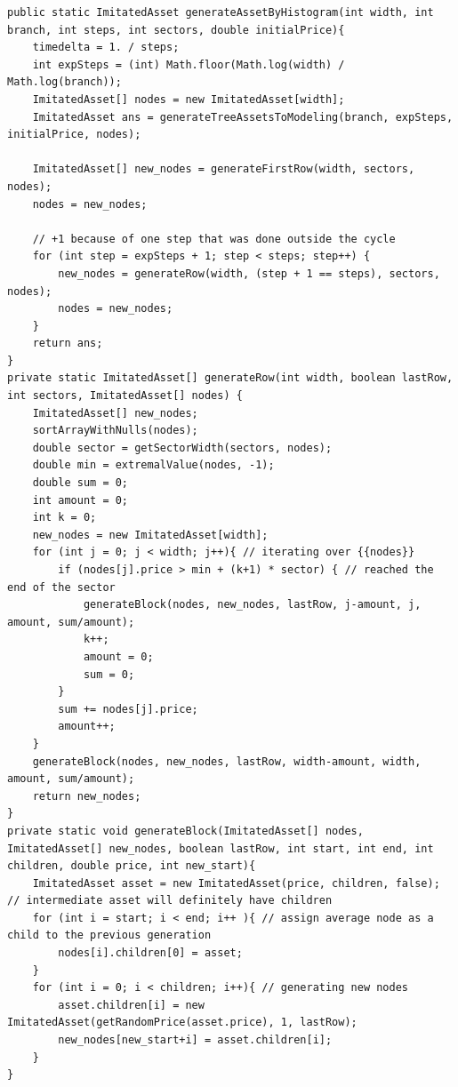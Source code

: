 \documentclass[12pt,twoside,titlepage,сa4paper]{article}
\begin{document}
	\begin{lstlisting}
public static ImitatedAsset generateAssetByHistogram(int width, int branch, int steps, int sectors, double initialPrice){
    timedelta = 1. / steps;
    int expSteps = (int) Math.floor(Math.log(width) / Math.log(branch));
    ImitatedAsset[] nodes = new ImitatedAsset[width];
    ImitatedAsset ans = generateTreeAssetsToModeling(branch, expSteps, initialPrice, nodes);

    ImitatedAsset[] new_nodes = generateFirstRow(width, sectors, nodes);
    nodes = new_nodes;

    // +1 because of one step that was done outside the cycle
    for (int step = expSteps + 1; step < steps; step++) {
        new_nodes = generateRow(width, (step + 1 == steps), sectors, nodes);
        nodes = new_nodes;
    }
    return ans;
}
private static ImitatedAsset[] generateRow(int width, boolean lastRow, int sectors, ImitatedAsset[] nodes) {
    ImitatedAsset[] new_nodes;
    sortArrayWithNulls(nodes);
    double sector = getSectorWidth(sectors, nodes);
    double min = extremalValue(nodes, -1);
    double sum = 0;
    int amount = 0;
    int k = 0;
    new_nodes = new ImitatedAsset[width];
    for (int j = 0; j < width; j++){ // iterating over {{nodes}}
        if (nodes[j].price > min + (k+1) * sector) { // reached the end of the sector
            generateBlock(nodes, new_nodes, lastRow, j-amount, j, amount, sum/amount);
            k++;
            amount = 0;
            sum = 0;
        }
        sum += nodes[j].price;
        amount++;
    }
    generateBlock(nodes, new_nodes, lastRow, width-amount, width, amount, sum/amount);
    return new_nodes;
}
private static void generateBlock(ImitatedAsset[] nodes, ImitatedAsset[] new_nodes, boolean lastRow, int start, int end, int children, double price, int new_start){
    ImitatedAsset asset = new ImitatedAsset(price, children, false); // intermediate asset will definitely have children
    for (int i = start; i < end; i++ ){ // assign average node as a child to the previous generation
        nodes[i].children[0] = asset;
    }
    for (int i = 0; i < children; i++){ // generating new nodes
        asset.children[i] = new ImitatedAsset(getRandomPrice(asset.price), 1, lastRow);
        new_nodes[new_start+i] = asset.children[i];
    }
}
	\end{lstlisting}
\end{document}
